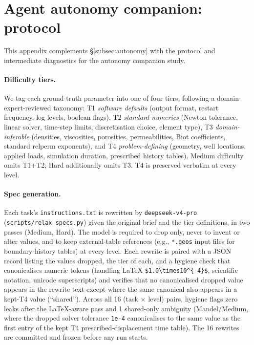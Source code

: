 \documentclass{article}
\begin{document}
\section{Agent autonomy companion: protocol}
\label{app:autonomy}

This appendix complements \S\ref{subsec:autonomy} with the protocol and intermediate diagnostics for the autonomy companion study.

\paragraph{Difficulty tiers.} We tag each ground-truth parameter into one of four tiers, following a domain-expert-reviewed taxonomy: T1 \emph{software defaults} (output format, restart frequency, log levels, boolean flags), T2 \emph{standard numerics} (Newton tolerance, linear solver, time-step limits, discretisation choice, element type), T3 \emph{domain-inferable} (densities, viscosities, porosities, permeabilities, Biot coefficients, standard relperm exponents), and T4 \emph{problem-defining} (geometry, well locations, applied loads, simulation duration, prescribed history tables). Medium difficulty omits T1+T2; Hard additionally omits T3. T4 is preserved verbatim at every level.

\paragraph{Spec generation.} Each task's \texttt{instructions.txt} is rewritten by \texttt{deepseek-v4-pro} (\texttt{scripts/relax\_specs.py}) given the original brief and the tier definitions, in two passes (Medium, Hard). The model is required to drop only, never to invent or alter values, and to keep external-table references (e.g., \texttt{*.geos} input files for boundary-history tables) at every level. Each rewrite is paired with a JSON record listing the values dropped, the tier of each, and a hygiene check that canonicalises numeric tokens (handling LaTeX \texttt{\$1.0\textbackslash times10\^{}\{-4\}\$}, scientific notation, unicode superscripts) and verifies that no canonicalised dropped value appears in the rewrite text except where the same canonical also appears in a kept-T4 value (``shared''). Across all 16 (task $\times$ level) pairs, hygiene flags zero leaks after the LaTeX-aware pass and 1 shared-only ambiguity (Mandel/Medium, where the dropped solver tolerance \texttt{1e-4} canonicalises to the same value as the first entry of the kept T4 prescribed-displacement time table). The 16 rewrites are committed and frozen before any run starts.
\end{document}
